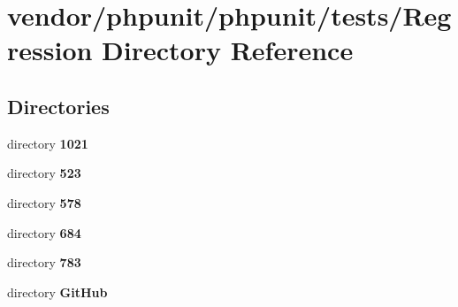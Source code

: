 \section{vendor/phpunit/phpunit/tests/\+Regression Directory Reference}
\label{dir_3635de160d4c0edea08c30054dce5860}
\subsection*{Directories}
\begin{DoxyCompactItemize}
\item 
directory {\bf 1021}
\item 
directory {\bf 523}
\item 
directory {\bf 578}
\item 
directory {\bf 684}
\item 
directory {\bf 783}
\item 
directory {\bf Git\+Hub}
\end{DoxyCompactItemize}
